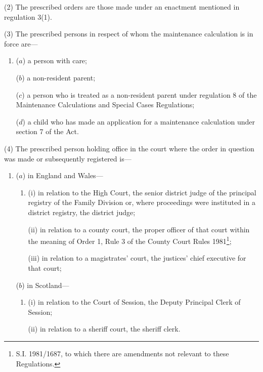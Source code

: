 \documentclass[12pt,a4paper]{article}
\begin{document}
(2) The prescribed orders are those made under an enactment mentioned in regulation 3(1).

(3) The prescribed persons in respect of whom the maintenance 
calculation 
is in force are—
\begin{enumerate}\item[]
($a$) a person with care;

($b$) 
a non-resident parent;

($c$) a person who is treated as 
a non-resident parent 
under 
regulation 8 of the Maintenance Calculations and Special Cases Regulations;  %

($d$) a child who has made an application for a maintenance 
calculation under section 7 of the Act.
\end{enumerate}

(4) The prescribed person holding office in the court where the order in question was made or subsequently registered is—
\begin{enumerate}\item[]
($a$) in England and Wales—
\begin{enumerate}\item[]
(i) in relation to the High Court, the senior district judge of the principal registry of the Family Division or, where proceedings were instituted in a district registry, the district judge;

(ii) in relation to a county court, the proper officer of that court within the meaning of Order 1, Rule 3 of the County Court Rules 1981\footnote{\frenchspacing S.I. 1981/1687, to which there are amendments not relevant to these Regulations.};

(iii) in relation to a magistrates' court, the 
justices' chief executive for  %
that court;
\end{enumerate}

($b$) in Scotland—
\begin{enumerate}\item[]
(i) in relation to the Court of Session, the Deputy Principal Clerk of Session;

(ii) in relation to a sheriff court, the sheriff clerk.
\end{enumerate}
\end{enumerate}
\end{document}
